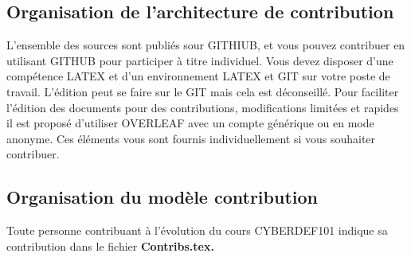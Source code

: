

\subsection{Organisation de l'architecture de contribution}

L'ensemble des sources sont publiés sour GITHIUB, et vous pouvez contribuer en utilisant GITHUB pour participer à titre individuel. Vous devez disposer d'une compétence LATEX et d'un environnement LATEX et GIT sur votre poste de travail. L'édition peut se faire sur le GIT mais cela est déconseillé. Pour faciliter l'édition des documents pour des contributions, modifications limitées et rapides il est proposé d'utiliser OVERLEAF avec un compte générique ou en mode anonyme. Ces éléments vous sont fournis individuellement si vous souhaiter contribuer.






\subsection{Organisation du modèle contribution}

Toute personne contribuant à l'évolution du cours CYBERDEF101 indique sa contribution dans le fichier \bf{Contribs.tex}.